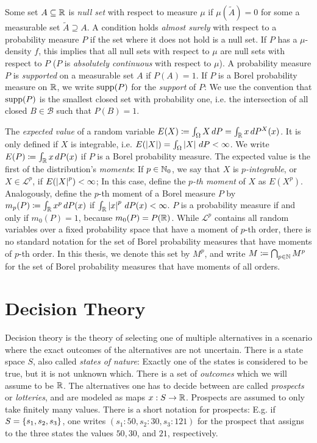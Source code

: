 \documentclass[a4paper,DIV=11,abstracton,twoside=semi]{scrreprt}
\newcommand{\B}{\mathcal{B}}
\theoremstyle{definition}
\begin{document}
    Some set $A \subseteq \mathbb{R}$ is \emph{null set} with respect to measure $\mu$ if $\mu(\tilde{A}) = 0$ for some a measurable set $\tilde{A} \supseteq A$.
    A condition holds \emph{almost surely} with respect to a probability measure $P$ if the set where it does not hold is a null set.
    If $P$ has a $\mu$-density $f$, this implies that all null sets with respect to $\mu$ are null sets with respect to $P$ ($P$ is \emph{absolutely continuous} with respect to $\mu$).
    A probability measure $P$ is \emph{supported} on a measurable set $A$ if $P(A) = 1$. If $P$ is a Borel probability measure on $\mathbb{R}$, we write $\operatorname{supp}(P)$ for the \emph{support} of $P$: We use the convention that $\operatorname{supp}(P)$ is the smallest closed set with probability one, i.e. the intersection of all closed $B \in \B$ such that $P(B) = 1$.
    \cite[p.63, p.170, Theorem 31.7]{bib:billingsleyProbabilityAndMeasure}
    
    The \emph{expected value} of a random variable $E(X) \coloneqq \int_{\Omega} X \, dP = \int_{\mathbb{R}} x \, dP^X(x)$. It is only defined if $X$ is integrable, i.e. $E(\left| X \right|) = \int_{\Omega} \left| X \right| \, dP < \infty$. We write $E(P) \coloneqq \int_{\mathbb{R}} x \, dP(x)$ if $P$ is a Borel probability measure.
    The expected value is the first of the distribution's \emph{moments}:
    If $p \in \mathbb{N}_0$, we say that $X$ is \emph{$p$-integrable}, or $X \in \mathcal{L}^p$, if $E(\left| X \right|^p) < \infty$;
    In this case, define the \emph{$p$-th moment} of $X$ as $E(X^p)$. Analogously, define the $p$-th moment of a Borel measure $P$ by $m_p(P) \coloneqq \int_{\mathbb{R}} x^p \, dP(x)$ if $\int_{\mathbb{R}} \left| x \right|^p \, dP(x) < \infty$.
    $P$ is a probability measure if and only if $m_0(P) = 1$, because $m_0(P) = P(\mathbb{R})$.
    While $\mathcal{L}^p$ contains all random variables over a fixed probability space that have a moment of $p$-th order, there is no standard notation for the set of Borel probability measures that have moments of $p$-th order. In this thesis, we denote this set by $M^p$, and write $M \coloneqq \bigcap_{p \in \mathbb{N}} M^p$ for the set of Borel probability measures that have moments of all orders.
    \cite[Section 21]{bib:billingsleyProbabilityAndMeasure}
    
    \section{Decision Theory}
    
    Decision theory is the theory of selecting one of multiple alternatives in a scenario where the exact outcomes of the alternatives are not uncertain.
    There is a state space $S$, also called \emph{states of nature}: Exactly one of the states is considered to be true, but it is not unknown which.
    There is a set of \emph{outcomes} which we will assume to be $\mathbb{R}$.
    The alternatives one has to decide between are called \emph{prospects} or \emph{lotteries}, and are modeled as maps $x: S \to \mathbb{R}$. Prospects are assumed to only take finitely many values. There is a short notation for prospects: E.g. if $S = \{s_1, s_2, s_3\}$, one writes $(s_1: 50, s_2: 30, s_3: 121)$ for the prospect that assigns to the three states the values $50, 30$, and $21$, respectively. \cite[Section 1.1]{bib:wakkerProspectTheory}
    
\end{document}

